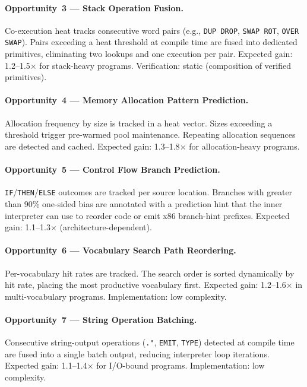 \paragraph{Opportunity~3 — Stack Operation Fusion.}
Co-execution heat tracks consecutive word pairs (e.g., \texttt{DUP DROP},
\texttt{SWAP ROT}, \texttt{OVER SWAP}). Pairs exceeding a heat threshold
at compile time are fused into dedicated primitives, eliminating two lookups
and one execution per pair. Expected gain: 1.2--1.5$\times$ for stack-heavy
programs. Verification: static (composition of verified primitives).

\paragraph{Opportunity~4 — Memory Allocation Pattern Prediction.}
Allocation frequency by size is tracked in a heat vector. Sizes exceeding
a threshold trigger pre-warmed pool maintenance. Repeating allocation
sequences are detected and cached. Expected gain: 1.3--1.8$\times$ for
allocation-heavy programs.

\paragraph{Opportunity~5 — Control Flow Branch Prediction.}
\texttt{IF}/\texttt{THEN}/\texttt{ELSE} outcomes are tracked per source
location. Branches with greater than 90\% one-sided bias are annotated
with a prediction hint that the inner interpreter can use to reorder code
or emit x86 branch-hint prefixes. Expected gain: 1.1--1.3$\times$
(architecture-dependent).

\paragraph{Opportunity~6 — Vocabulary Search Path Reordering.}
Per-vocabulary hit rates are tracked. The search order is sorted
dynamically by hit rate, placing the most productive vocabulary first.
Expected gain: 1.2--1.6$\times$ in multi-vocabulary programs.
Implementation: low complexity.

\paragraph{Opportunity~7 — String Operation Batching.}
Consecutive string-output operations (\texttt{."}, \texttt{EMIT},
\texttt{TYPE}) detected at compile time are fused into a single batch
output, reducing interpreter loop iterations. Expected gain:
1.1--1.4$\times$ for I/O-bound programs. Implementation: low complexity.

